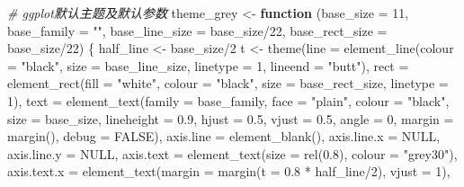 \documentclass[
]{book}
\newenvironment{Shaded}{\begin{snugshade}}{\end{snugshade}}
\newcommand{\AttributeTok}[1]{\textcolor[rgb]{0.77,0.63,0.00}{#1}}
\newcommand{\CommentTok}[1]{\textcolor[rgb]{0.56,0.35,0.01}{\textit{#1}}}
\newcommand{\ConstantTok}[1]{\textcolor[rgb]{0.00,0.00,0.00}{#1}}
\newcommand{\ControlFlowTok}[1]{\textcolor[rgb]{0.13,0.29,0.53}{\textbf{#1}}}
\newcommand{\DecValTok}[1]{\textcolor[rgb]{0.00,0.00,0.81}{#1}}
\newcommand{\FloatTok}[1]{\textcolor[rgb]{0.00,0.00,0.81}{#1}}
\newcommand{\FunctionTok}[1]{\textcolor[rgb]{0.00,0.00,0.00}{#1}}
\newcommand{\NormalTok}[1]{#1}
\newcommand{\OtherTok}[1]{\textcolor[rgb]{0.56,0.35,0.01}{#1}}
\newcommand{\SpecialCharTok}[1]{\textcolor[rgb]{0.00,0.00,0.00}{#1}}
\newcommand{\StringTok}[1]{\textcolor[rgb]{0.31,0.60,0.02}{#1}}
\begin{document}
\begin{Shaded}
\begin{Highlighting}[]
\CommentTok{\# ggplot默认主题及默认参数}
\NormalTok{theme\_grey }\OtherTok{\textless{}{-}} \ControlFlowTok{function}\NormalTok{ (}\AttributeTok{base\_size =} \DecValTok{11}\NormalTok{, }\AttributeTok{base\_family =} \StringTok{""}\NormalTok{, }\AttributeTok{base\_line\_size =}\NormalTok{ base\_size}\SpecialCharTok{/}\DecValTok{22}\NormalTok{, }\AttributeTok{base\_rect\_size =}\NormalTok{ base\_size}\SpecialCharTok{/}\DecValTok{22}\NormalTok{) \{}
\NormalTok{    half\_line }\OtherTok{\textless{}{-}}\NormalTok{ base\_size}\SpecialCharTok{/}\DecValTok{2}
\NormalTok{    t }\OtherTok{\textless{}{-}} \FunctionTok{theme}\NormalTok{(}\AttributeTok{line =} \FunctionTok{element\_line}\NormalTok{(}\AttributeTok{colour =} \StringTok{"black"}\NormalTok{, }\AttributeTok{size =}\NormalTok{ base\_line\_size, }\AttributeTok{linetype =} \DecValTok{1}\NormalTok{, }\AttributeTok{lineend =} \StringTok{"butt"}\NormalTok{), }
               \AttributeTok{rect =} \FunctionTok{element\_rect}\NormalTok{(}\AttributeTok{fill =} \StringTok{"white"}\NormalTok{, }\AttributeTok{colour =} \StringTok{"black"}\NormalTok{, }\AttributeTok{size =}\NormalTok{ base\_rect\_size, }\AttributeTok{linetype =} \DecValTok{1}\NormalTok{), }
               \AttributeTok{text =} \FunctionTok{element\_text}\NormalTok{(}\AttributeTok{family =}\NormalTok{ base\_family, }\AttributeTok{face =} \StringTok{"plain"}\NormalTok{, }\AttributeTok{colour =} \StringTok{"black"}\NormalTok{, }\AttributeTok{size =}\NormalTok{ base\_size, }\AttributeTok{lineheight =} \FloatTok{0.9}\NormalTok{, }\AttributeTok{hjust =} \FloatTok{0.5}\NormalTok{, }\AttributeTok{vjust =} \FloatTok{0.5}\NormalTok{, }\AttributeTok{angle =} \DecValTok{0}\NormalTok{, }\AttributeTok{margin =} \FunctionTok{margin}\NormalTok{(), }\AttributeTok{debug =} \ConstantTok{FALSE}\NormalTok{), }
               \AttributeTok{axis.line =} \FunctionTok{element\_blank}\NormalTok{(), }
               \AttributeTok{axis.line.x =} \ConstantTok{NULL}\NormalTok{, }
               \AttributeTok{axis.line.y =} \ConstantTok{NULL}\NormalTok{, }
               \AttributeTok{axis.text =} \FunctionTok{element\_text}\NormalTok{(}\AttributeTok{size =} \FunctionTok{rel}\NormalTok{(}\FloatTok{0.8}\NormalTok{), }\AttributeTok{colour =} \StringTok{"grey30"}\NormalTok{), }
               \AttributeTok{axis.text.x =} \FunctionTok{element\_text}\NormalTok{(}\AttributeTok{margin =} \FunctionTok{margin}\NormalTok{(}\AttributeTok{t =} \FloatTok{0.8} \SpecialCharTok{*}\NormalTok{ half\_line}\SpecialCharTok{/}\DecValTok{2}\NormalTok{), }\AttributeTok{vjust =} \DecValTok{1}\NormalTok{), }

\end{Highlighting}
\end{Shaded}
\end{document}
